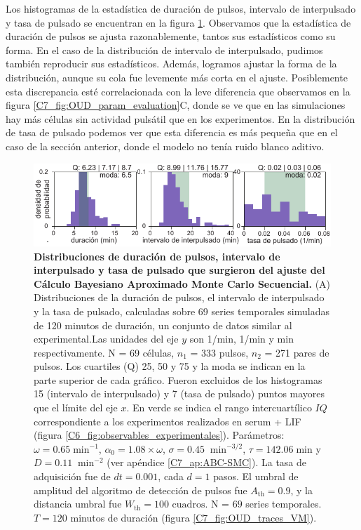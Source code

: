 \documentclass[./main.tex]{subfiles}
\begin{document}
Los histogramas de la estadística de duración de pulsos, intervalo de interpulsado y tasa de pulsado se encuentran en la figura \ref{C7_fig:OUD_param_evaluation_hist}. Observamos que la estadística de duración de pulsos se ajusta razonablemente, tantos sus estadísticos como su forma. En el caso de la distribución de intervalo de interpulsado, pudimos también reproducir sus estadísticos. Además, logramos ajustar la forma de la distribución, aunque su cola fue levemente más corta en el ajuste. Posiblemente esta discrepancia esté correlacionada con la leve diferencia que observamos en la figura \ref{C7_fig:OUD_param_evaluation}C, donde se ve que en las simulaciones hay más células sin actividad pulsátil que en los experimentos. En la distribución de tasa de pulsado podemos ver que esta diferencia es más pequeña que en el caso de la sección anterior, donde el modelo no tenía ruido blanco aditivo. 


\begin{figure}
    \centering
    \includegraphics[width=1\columnwidth]{figures/chapter7/C7_OUD_validation_hist.pdf} 
    \caption{\textbf{Distribuciones de duración de pulsos, intervalo de interpulsado y tasa de pulsado que surgieron del ajuste del Cálculo Bayesiano Aproximado Monte Carlo Secuencial.} (A) Distribuciones de la duración de pulsos, el intervalo de interpulsado y la tasa de pulsado, calculadas sobre 69 series temporales simuladas de 120 minutos de duración, un conjunto de datos similar al experimental.Las unidades del eje $y$ son 1/min, 1/min y min respectivamente. N = 69 células, $n_1$ = 333 pulsos, $n_2$ = 271 pares de pulsos. Los cuartiles (Q) 25, 50 y 75 y la moda se indican en la parte superior de cada gráfico. Fueron excluidos de los histogramas 15 (intervalo de interpulsado) y 7 (tasa de pulsado) puntos mayores que el límite del eje $x$. En verde se indica el rango intercuartílico $IQ$ correspondiente a los experimentos realizados en serum + LIF (figura \ref{C6_fig:observables_experimentales}). Parámetros:  $\omega = 0.65 \; \text{min}^{-1}$, $\alpha_0 = 1.08 \times \omega$, $ \sigma = 0.45 \; \; \text{min}^{-3/2}$, $\tau = 142.06 \; \text{min} $ y $D = 0.11 \; \; \text{min}^{-2}$ (ver apéndice \ref{C7_ap:ABC-SMC}). La tasa de adquisición fue de $dt = 0.001$, cada $d = 1$ pasos. El umbral de amplitud del algoritmo de detección de pulsos fue $A_{\text{th}} = 0.9$, y la distancia umbral fue $W_{\text{th}} = 100\text{ cuadros}$. N = $69$ series temporales. $T = 120$ minutos de duración (figura \ref{C7_fig:OUD_traces_VM}).}
    \label{C7_fig:OUD_param_evaluation_hist}
\end{figure} 
\end{document}
